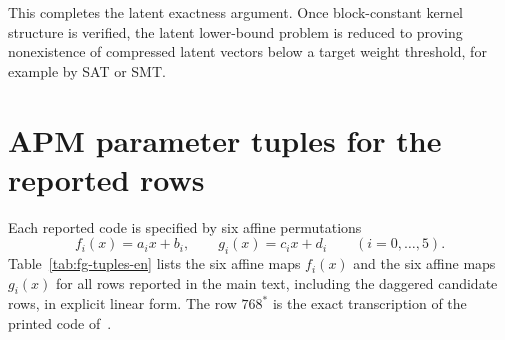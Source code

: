 \documentclass[11pt]{article}
\theoremstyle{uprightthm}
\begin{document}
This completes the latent exactness argument. Once block-constant kernel
structure is verified, the latent lower-bound problem is reduced to proving
nonexistence of compressed latent vectors below a target weight threshold, for
example by SAT or SMT.

\iffalse
\section{APM parameter tuples for the reported rows}
\label{app:fg-table-en}
Each reported code is specified by six affine permutations
\[
f_i(x)=a_i x+b_i,\qquad
g_i(x)=c_i x+d_i
\qquad (i=0,\dots,5).
\]
Table~\ref{tab:fg-tuples-en} lists the six affine maps $f_i(x)$ and the six affine maps $g_i(x)$
for all rows reported in the main text, including the daggered candidate rows,
in explicit linear form.
The row $768^\ast$ is the exact transcription of the printed code of~\cite{Kasai2026}.
\end{document}
